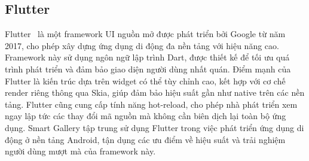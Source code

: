 

    

\subsection{Flutter}
Flutter~\cite{flutterdoc} là một framework UI nguồn mở được phát triển bởi Google từ năm 2017, cho phép xây dựng ứng dụng di động đa nền tảng với hiệu năng cao. Framework này sử dụng ngôn ngữ lập trình Dart, được thiết kế để tối ưu quá trình phát triển và đảm bảo giao diện người dùng nhất quán. Điểm mạnh của Flutter là kiến trúc dựa trên widget có thể tùy chỉnh cao, kết hợp với cơ chế render riêng thông qua Skia, giúp đảm bảo hiệu suất gần như native trên các nền tảng. Flutter cũng cung cấp tính năng hot-reload, cho phép nhà phát triển xem ngay lập tức các thay đổi mã nguồn mà không cần biên dịch lại toàn bộ ứng dụng. Smart Gallery tập trung sử dụng Flutter trong việc phát triển ứng dụng di động ở nền tảng Android, tận dụng các ưu điểm về hiệu suất và trải nghiệm người dùng mượt mà của framework này.

